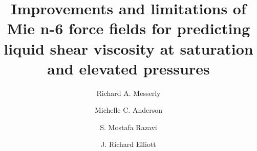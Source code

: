 \documentclass[preprint,review,12pt]{elsarticle}
\begin{document}
	
	\begin{frontmatter}
		
		
		
		\title{Improvements and limitations of Mie n-6 force fields for predicting liquid shear viscosity at saturation and elevated pressures}
		
		
		\author{Richard A. Messerly}
		\address{Thermodynamics Research Center, National Institute of Standards and Technology, Boulder, Colorado, 80305}
		
		\author{Michelle C. Anderson}
		\address{Thermodynamics Research Center, National Institute of Standards and Technology, Boulder, Colorado, 80305}
		
		\author{S. Mostafa Razavi}
		\address{Department of Chemical and Biomolecular Engineering, The University of Akron}
		
		\author{J. Richard Elliott}
		\address{Department of Chemical and Biomolecular Engineering, The University of Akron}
		

\end{frontmatter}
\end{document}
